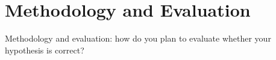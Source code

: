 \section{Methodology and Evaluation}
\label{sec:methodology}
Methodology and evaluation: how do you plan to evaluate whether your
hypothesis is correct?
